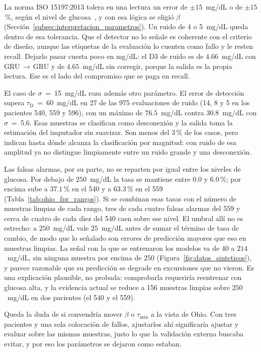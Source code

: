 \documentclass{report}
\begin{document}
La norma ISO 15197:2013 tolera en una lectura un error de $\pm 15$~mg/dL o de $\pm 15$\,\%, según el nivel de glucosa~\cite{iso15197_2013}, y con esa lógica se eligió $\beta$ (Sección~\ref{subsec:interpretacion_parametros}). Un ruido de 4 o 5~mg/dL queda dentro de esa tolerancia. Que el detector no lo señale es coherente con el criterio de diseño, aunque las etiquetas de la evaluación lo cuenten como fallo y le resten recall. Dejarlo pasar cuesta poco en mg/dL: el D3 de ruido es de $4.66$~mg/dL con GRU\,$\rightarrow$\,GRU y de $4.65$~mg/dL sin corregir, porque la salida es la propia lectura. Ese es el lado del compromiso que se paga en recall.

El caso de $\sigma$~=~15~mg/dL roza además otro parámetro. El error de detección supera $\tau_{\mathrm{D}}$~=~60~mg/dL en 27 de las 975 evaluaciones de ruido (14, 8 y 5 en los pacientes 540, 559 y 596), con un máximo de $76.5$~mg/dL contra $30.8$~mg/dL con $\sigma$~=~5.6. Esas muestras se clasifican como desconexión y la salida toma la estimación del imputador sin suavizar. Son menos del 3\,\% de los casos, pero indican hasta dónde alcanza la clasificación por magnitud: con ruido de esa amplitud ya no distingue limpiamente entre un ruido grande y una desconexión.

Las falsas alarmas, por su parte, no se reparten por igual entre los niveles de glucosa. Por debajo de $250$~mg/dL la tasa se mantiene entre $0.0$ y $6.0$\,\%; por encima sube a $37.1$\,\% en el 540 y a $63.3$\,\% en el 559 (Tabla~\ref{tab:ohio_fpr_rangos}). Si se combinan esas tasas con el número de muestras limpias de cada rango, tres de cada cuatro falsas alarmas del 559 y cerca de cuatro de cada diez del 540 caen sobre ese nivel. El umbral allí no es estrecho: a $250$~mg/dL vale $25$~mg/dL antes de sumar el término de tasa de cambio, de modo que lo señalado son errores de predicción mayores que eso en muestras limpias. La señal con la que se entrenaron los modelos va de $40$ a $214$~mg/dL, sin ninguna muestra por encima de $250$ (Figura~\ref{fig:datos_sinteticos}), y parece razonable que su predicción se degrade en excursiones que no vieron. Es una explicación plausible, no probada: comprobarla requeriría reentrenar con glucosa alta, y la evidencia actual se reduce a 156 muestras limpias sobre $250$~mg/dL en dos pacientes (el 540 y el 559).

Queda la duda de si convendría mover $\beta$ o $\tau_{\min}$ a la vista de Ohio. Con tres pacientes y una sola colocación de fallos, ajustarlos ahí significaría ajustar y evaluar sobre las mismas muestras, justo lo que la validación externa buscaba evitar, y por eso los parámetros se dejaron como estaban.
\end{document}
